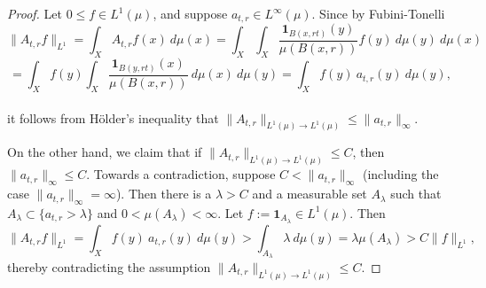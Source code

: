 \documentclass[10pt,a4paper]{amsart}
\begin{document}
\begin{proof}
	Let $0 \le f \in L^1(\mu)$, and suppose  $a_{t,r} \in L^\infty (\mu)$. Since by
	Fubini-Tonelli
	\begin{equation*}\label{fubini}
		\|A_{t,r} f\|_{L^1} 
		=
		\int_X A_{t,r} f(x)  \  d\mu(x)
		=
		\int_X\int_X  \frac{\mathbf{1}_{B(x,rt)}(y) }{\mu (B(x,r))} f (y) \  d\mu(y) \  d\mu(x)
	\end{equation*}
	\begin{equation*}\label{fubini2}
		= 
		\int_X  f (y) \int_X  \frac{\mathbf{1}_{B(y,rt)}(x)}{\mu (B(x,r))}  \  d\mu(x) \  d\mu(y)
		= 
		\int_X  f (y) \ a_{t,r}(y) \  d\mu(y),
	\end{equation*}\\
	it follows from H\"older's inequality that $\|A_{t,r} \|_{L^1(\mu)\to L^1(\mu)} \le \|a_{t,r}\|_\infty. 
	$
	
	
	On the other hand, we claim that if $\|A_{t,r} \|_{L^1(\mu)\to L^1(\mu)} \le C$, then $\|a_{t,r}\|_\infty
	\le C. 
	$
	Towards a contradiction, suppose $C < \|a_{t,r}\|_\infty$ (including the case $\|a_{t,r}\|_\infty
	= \infty$). Then there is a $\lambda > C$ and a measurable set $A_\lambda$ such that 
	$A_\lambda \subset \{ a_{t,r}> \lambda\}$ and $0 < \mu (A_\lambda)  < \infty$. Let $f:= \mathbf{1}_{A_\lambda} \in L^1(\mu)$.
	Then 
	\begin{equation*}\label{fubini3}
		\|A_{t,r} f\|_{L^1} 
		=
		\int_X  f (y) \  a_{t,r}(y) \  d\mu(y)
		>  \int_{A_\lambda}  \lambda  \  d\mu(y)
		= \lambda \mu (A_\lambda) > C \|f\|_{L^1},
	\end{equation*}
thereby contradicting the assumption $\|A_{t,r} \|_{L^1(\mu)\to L^1(\mu)} \le C$.
\end{proof}
\end{document}

